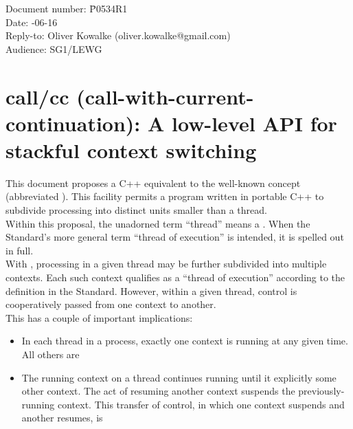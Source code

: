 \documentclass[fontsize=10pt,paper=A4,pagesize,DIV=15]{scrartcl}
\begin{document}
\small
\begin{tabbing}
    Document number: \= P0534R1\\
    Date:            -06-16\\
    Reply-to:        \> Oliver Kowalke (oliver.kowalke@gmail.com)\\
    Audience:        \> SG1/LEWG\\
\end{tabbing}

\section*{call/cc (call-with-current-continuation): A low-level API for stackful context switching}


\tableofcontents


This document proposes a C++ equivalent to the well-known concept
 (abbreviated ). This
facility permits a program written in portable C++ to subdivide processing into
distinct  units smaller than a thread.\\

Within this proposal, the unadorned term ``thread'' means a .
When the Standard's more general term ``thread of execution'' is intended, it
is spelled out in full.\\

With \cc, processing in a given thread may be further subdivided into multiple
contexts. Each such context qualifies as a ``thread of execution'' according
to the definition in the Standard. However, within a given thread, control is
cooperatively passed from one context to another.\\

This has a couple of important implications:

\begin{itemize}
\item In each thread in a process, exactly one context is running at any given
  time. All others are 
\item The running context on a thread continues running until it explicitly
   some other context. The act of resuming another context
  suspends the previously-running context. This transfer of control, in which
  one context suspends and another resumes, is 
\end{itemize}
\end{document}
